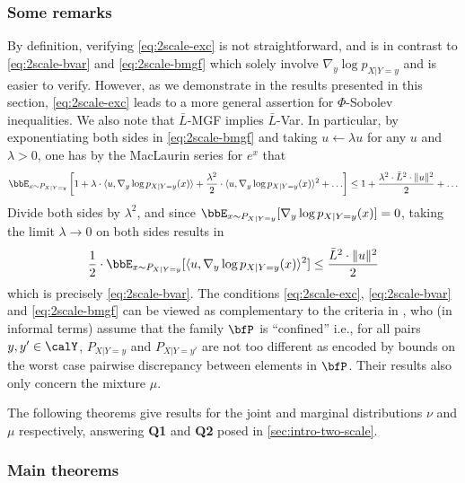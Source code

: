 \documentclass[11pt]{article}
\newcounter{ct}
\begin{document}
\subsubsection{Some remarks}
By definition, verifying \ref{eq:2scale-exc} is not straightforward, and is in contrast to \ref{eq:2scale-bvar} and \ref{eq:2scale-bmgf} which solely involve \(\nabla_{y}\log p_{X | Y = y}\) and is easier to verify.
However, as we demonstrate in the results presented in this section, \ref{eq:2scale-exc} leads to a more general assertion for \(\Phi\)-Sobolev inequalities.
We also note that \(\bar{L}\)-\textsf{MGF} implies \(\bar{L}\)-\textsf{Var}.
In particular, by exponentiating both sides in \ref{eq:2scale-bmgf} and taking \(u \leftarrow \lambda u\) for any \(u\) and \(\lambda > 0\), one has by the MacLaurin series for \(e^{x}\) that
\begin{equation*}
    \bbE_{x \sim P_{X | Y = y}}\left[1 + \lambda \cdot \langle u, \nabla_{y} \log p_{X | Y = y}(x)\rangle + \frac{\lambda^{2}}{2} \cdot \langle u, \nabla_{y} \log p_{X | Y = y}(x)\rangle^{2} + \ldots \right] \leq 1 + \frac{\lambda^{2} \cdot \bar{L}^{2} \cdot \|u\|^{2}}{2} + \ldots
\end{equation*}
Divide both sides by \(\lambda^{2}\), and since \(\bbE_{x \sim P_{X | Y = y}}[\nabla_{y}\log p_{X | Y = y}(x)] = 0\), taking the limit \(\lambda \to 0\) on both sides results in
\begin{equation*}
    \frac{1}{2} \cdot \bbE_{x \sim P_{X | Y = y}}[\langle u, \nabla_{y} \log p_{X | Y = y}(x)\rangle^{2}] \leq \frac{\bar{L}^{2} \cdot \|u\|^{2}}{2}
\end{equation*}
which is precisely \ref{eq:2scale-bvar}.
The conditions \ref{eq:2scale-exc}, \ref{eq:2scale-bvar} and \ref{eq:2scale-bmgf} can be viewed as complementary to the criteria in \citet{chen2021dimension}, who (in informal terms) assume that the family \(\bfP\) is ``confined'' i.e., for all pairs \(y, y' \in \calY\), \(P_{X | Y = y}\) and \(P_{X | Y = y'}\) are not too different as encoded by bounds on the worst case pairwise discrepancy between elements in \(\bfP\).
Their results also only concern the mixture \(\mu\).

The following theorems give results for the joint and marginal distributions \(\nu\) and \(\mu\) respectively, answering \textbf{Q1} and \textbf{Q2} posed in \cref{sec:intro-two-scale}.

\subsubsection{Main theorems}
\end{document}
